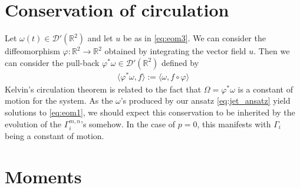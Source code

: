 \documentclass[12pt]{amsart}
\newcommand{\R}{\ensuremath{\mathbb{R}}}
\begin{document}
\section{Conservation of circulation}
\label{sec:circulation}
Let $\omega(t) \in \mathcal{D}'(\R^2)$ and let $u$ be as in \eqref{eq:eom3}.
We can consider the diffeomorphism $\varphi: \mathbb{R}^2 \to \mathbb{R}^2$
obtained by integrating the vector field $u$.
Then we can consider the pull-back $\varphi^*\omega \in \mathcal{D}'(\mathbb{R}^2)$ defined by
\begin{align*}
  \langle \varphi^* \omega , f \rangle := \langle \omega , f \circ \varphi \rangle
\end{align*}
Kelvin's circulation theorem is related to the fact that $\Omega =\varphi^* \omega$ is a constant of motion for the system.
As the $\omega$'s produced by our ansatz \eqref{eq:jet_ansatz} yield solutions to \eqref{eq:eom1}, we should expect this conservation to be inherited by the evolution of the $\Gamma^{m,n}_i$'s somehow.  In the case of $p=0$, this manifests with $\Gamma_i$ being a constant of motion.


\section{Moments}
\label{sec:moments}
\end{document}
